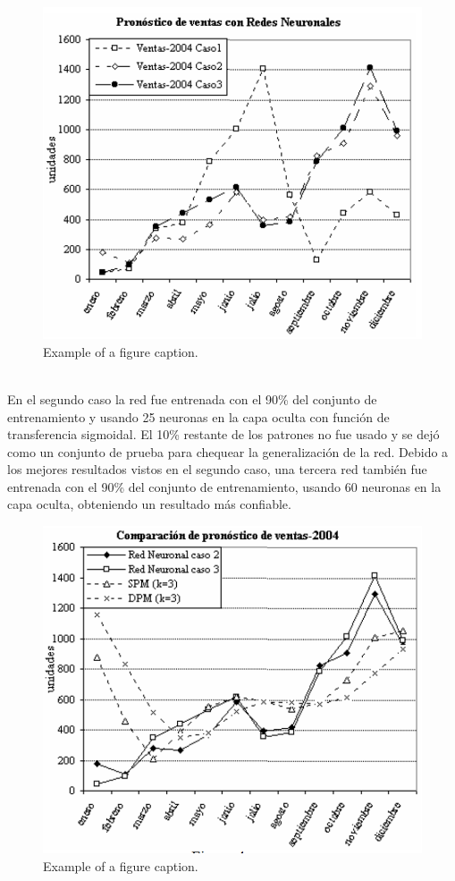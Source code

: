 \documentclass[conference]{IEEEtran}
\begin{document}
\begin{figure}[t]
    \centering
    \centerline{\includegraphics[scale=0.4]{img/figura1.png}}
    \caption{Example of a figure caption.}
    \label{fig}
\end{figure}\\

En el segundo caso la red fue entrenada con el 90\% del conjunto de entrenamiento y usando 25 neuronas en la capa oculta con función de transferencia sigmoidal.  El 10\% restante de los patrones no fue usado y se dejó como un conjunto de prueba para chequear la generalización de la red.
Debido a los mejores resultados vistos en el segundo caso, una tercera red también fue entrenada con el 90\% del conjunto de entrenamiento, usando 60 neuronas en la capa oculta, obteniendo un resultado más confiable.

\begin{figure}[t]

    \centerline{\includegraphics[scale=0.4]{img/figura2.png}}
    \caption{Example of a figure caption.}
    \label{fig}
\end{figure}\\
\end{document}
